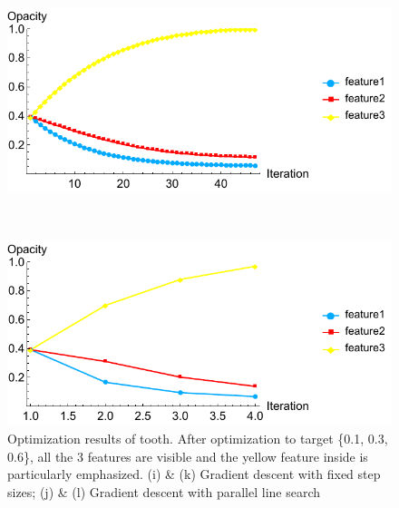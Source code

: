 \begin{figure}
	\begin{minipage}{.49\textwidth}
		\includegraphics[width=1\linewidth]{figures/tooth_naive_opacity_fixed}
		\subcaption{}
	\end{minipage}~
	\begin{minipage}{.49\textwidth}
		\includegraphics[width=1\linewidth]{figures/tooth_naive_opacity_parallelsearch}
		\subcaption{}
	\end{minipage}
	\caption[Optimization results of tooth]
	{Optimization results of tooth. After optimization to target \{0.1, 0.3, 0.6\}, all the 3 features are visible and the yellow feature inside is particularly emphasized. (i) \& (k) Gradient descent with fixed step sizes; (j) \& (l) Gradient descent with parallel line search}
	\label{fig:tooth_naive_optimized}
\end{figure}

